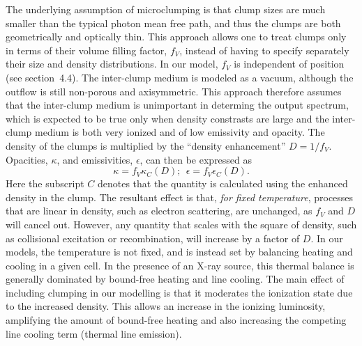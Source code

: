 The underlying assumption of microclumping is that clump sizes 
are much smaller than the 
typical photon mean free path, and thus the clumps are 
both geometrically and optically thin. This approach 
allows one to treat clumps only in terms of their volume filling factor, $f_V$, 
instead of having to specify separately their size and density distributions.
In our model, $f_V$ is independent of position (see section~4.4).
The inter-clump medium is modeled as a vacuum,
although the outflow is still non-porous and axisymmetric.
This approach therefore assumes that the inter-clump medium
is unimportant in determing the output spectrum, which
is expected to be true only when density constrasts are large and
the inter-clump medium is both very ionized and of low emissivity and opacity.
The density of the clumps is multiplied by the ``density enhancement'' 
$D=1/f_V$. Opacities, $\kappa$, and emissivities, $\epsilon$, 
can then be expressed as 
\begin{equation}
\kappa = f_V \kappa_C(D);~~\epsilon = f_V \epsilon_C(D).
\end{equation}
Here the subscript $C$ denotes that the quantity is calculated using the 
enhanced density in the clump. The resultant effect is that, {\em for fixed temperature},
processes that are linear in density, such as electron scattering, are unchanged, 
as $f_V$ and $D$ will cancel out. However, any quantity that scales with the square of density, 
such as collisional excitation or recombination, will increase by a factor of $D$.
In our models, the temperature is not fixed, and is instead set by balancing heating and 
cooling in a given cell. In the presence of an X-ray source, this thermal balance is 
generally dominated by bound-free heating and line cooling. The main effect of including 
clumping in our modelling is that it moderates the ionization state due to the increased 
density. This allows an increase in the ionizing luminosity, amplifying the amount of
bound-free heating and also increasing the competing line cooling term
(thermal line emission).

